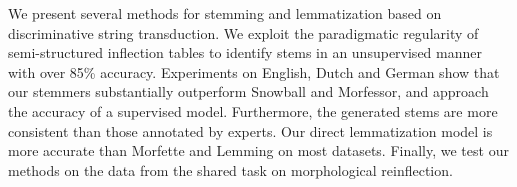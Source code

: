 We present several methods for stemming and lemmatization based on discriminative string transduction. We exploit the paradigmatic regularity of semi-structured inflection tables to identify stems in an unsupervised manner with over 85\% accuracy.  Experiments on English, Dutch and German show that our stemmers substantially outperform Snowball and Morfessor, and approach the accuracy of a supervised model. Furthermore, the generated stems are more consistent than those annotated by experts. Our direct lemmatization model is more accurate than Morfette and Lemming on most datasets. Finally, we test our methods on the data from the shared task on morphological reinflection.
